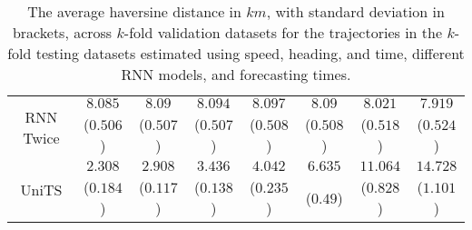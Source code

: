 \begin{table}[!ht]
{\begin{tabular}{|c|c|c|c|c|c|c|c|}
			\multirow{2}{*}{RNN Twice} & $8.085$ & $8.09$ & $8.094$ & $8.097$ & $8.09$ & $8.021$ & $7.919$ \\
			 & ($0.506$) & ($0.507$) & ($0.507$) & ($0.508$) & ($0.508$) & ($0.518$) & ($0.524$) \\ \hline
			\multirow{2}{*}{UniTS} & $2.308$ & $2.908$ & $3.436$ & $4.042$ & $6.635$ & $11.064$ & $14.728$ \\
			 & ($0.184$) & ($0.117$) & ($0.138$) & ($0.235$) & ($0.49$) & ($0.828$) & ($1.101$) \\ \hline
		\end{tabular}
	}
	\caption{The average haversine distance in $km$, with standard deviation in brackets, across $k$-fold validation datasets for the trajectories in the $k$-fold testing datasets estimated using speed, heading, and time, different RNN models, and forecasting times.}
	\label{tab:all_speed_actual_dir_haversine}
\end{table}